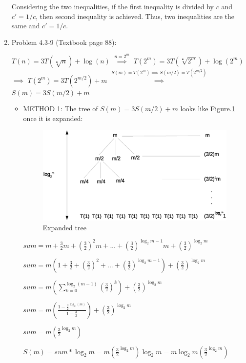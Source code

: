 \documentclass[11pt]{article}
\begin{document}
\begin{enumerate}
	Considering the two inequalities, if the first inequality is divided by $c$ and $c{'} = 1/c$, then second inequality is achieved. Thus, two inequalities are the same and $c{'} = 1/c$.  





\pagebreak

\item Problem 4.3-9 (Textbook page 88):
	
	$ T(n) = 3T(\sqrt[•]{n}) + \log(n) $ 
	$ \overset{n=2^m}{\implies} $ 
	$ T(2^m) = 3T(\sqrt[•]{2^m}) + \log(2^m) $ 
	$ \implies $ 
	$T(2^m) = 3T(2^{m/2}) + m $ 
	$ \overset{S(m)=T(2^m) \implies S(m/2)=T(2^{m/2})}{\implies} $ 
	$ S(m) = 3S(m/2) + m$ 
	
	
	\begin{itemize}
    	\item METHOD 1:
     	The tree of $ S(m) = 3S(m/2) + m$ looks like Figure.\ref{fig:prob2} once it is expanded:
     	
		\begin{figure}[h!]
			\centerline{\includegraphics[width=5in]{prob2.eps}}
			\caption{Expanded tree}
			\label{fig:prob2}
		\end{figure}
	
		$sum =m+\frac{3}{2}m+{(\frac{3}{2})}^2m+...+{(\frac{3}{2})}^{\log_2{m-1}}m+{(\frac{3}{2})}^{\log_2{m}}$
	
		$sum =m(1+\frac{3}{2}+{(\frac{3}{2})}^2+...+{(\frac{3}{2})}^{\log_2{m-1}})+{(\frac{3}{2})}^{\log_2{m}}$
	
		$sum =m(\sum_{k=0}^{\log_2{(m-1)}} (\frac{3}{2})^k)+{(\frac{3}{2})}^{\log_2{m}}$
	
		$sum =m(  \frac{1-\frac{3}{2}^{\log_2{(m)}}}{1-\frac{3}{2}}   )+{(\frac{3}{2})}^{\log_2{m}}$
	
		$sum = m( \frac{3}{2}^{\log_2{m}}   )  $
	
	
		$S(m)=sum*\log_2{m} = m( \frac{3}{2}^{\log_2{m}}   )\log_2{m} = m\log_2{m}( \frac{3}{2}^{\log_2{m}}   )  $
	

\end{itemize}
\end{enumerate}
\end{document}
